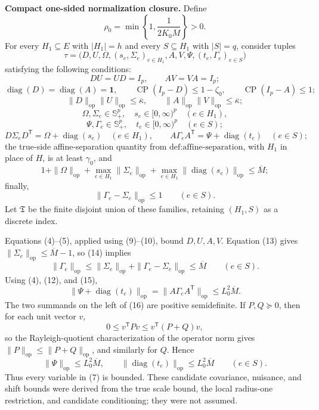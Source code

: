 \textbf{Compact one-sided normalization closure.}
Define
\[
\rho_0=\min\left\{1,\frac{1}{2K_0\overline M}\right\}>0.
\tag{6}
\]
For every \(H_1\subseteq E\) with \(|H_1|=h\) and every \(S\subseteq H_1\) with \(|S|=q\), consider tuples
\[
\tau=\bigl(D,U,\Omega,(s_e,\Sigma_e)_{e\in H_1},
A,V,\Psi,(t_e,\Gamma_e)_{e\in S}\bigr)
\tag{7}
\]
satisfying the following conditions:
\[
DU=UD=I_p,
\qquad
AV=VA=I_p;
\tag{8}
\]
\[
\operatorname{diag}(D)=\operatorname{diag}(A)=\mathbf 1,
\qquad
\operatorname{CP}(I_p-D)\leq1-\zeta_0,
\qquad
\operatorname{CP}(I_p-A)\leq1;
\tag{9}
\]
\[
\|D\|_{\mathrm{op}}\|U\|_{\mathrm{op}}
\leq\overline\kappa,
\qquad
\|A\|_{\mathrm{op}}\|V\|_{\mathrm{op}}
\leq\overline\kappa;
\tag{10}
\]
\[
\Omega,\Sigma_e\in\mathbb S_+^p,\quad
s_e\in[0,\infty)^p\quad(e\in H_1),
\]
\[
\Psi,\Gamma_e\in\mathbb S_+^p,\quad
t_e\in[0,\infty)^p\quad(e\in S);
\tag{11}
\]
\[
D\Sigma_eD^{\mathsf T}=\Omega+\operatorname{diag}(s_e)
\quad(e\in H_1),
\qquad
A\Gamma_eA^{\mathsf T}=\Psi+\operatorname{diag}(t_e)
\quad(e\in S);
\tag{12}
\]
the true-side affine-separation quantity from \(\text{def:affine-separation}\), with \(H_1\) in place of \(H\), is at least \(\gamma_0\), and
\[
1+\|\Omega\|_{\mathrm{op}}
+\max_{e\in H_1}\|\Sigma_e\|_{\mathrm{op}}
+\max_{e\in H_1}\|\operatorname{diag}(s_e)\|_{\mathrm{op}}
\leq\overline M;
\tag{13}
\]
finally,
\[
\|\Gamma_e-\Sigma_e\|_{\mathrm{op}}\leq1
\qquad(e\in S).
\tag{14}
\]
Let \(\mathfrak T\) be the finite disjoint union of these families, retaining \((H_1,S)\) as a discrete index.

Equations (4)--(5), applied using (9)--(10), bound \(D,U,A,V\). Equation (13) gives \(\|\Sigma_e\|_{\mathrm{op}}\leq\overline M-1\), so (14) implies
\[
\|\Gamma_e\|_{\mathrm{op}}
\leq\|\Sigma_e\|_{\mathrm{op}}
+\|\Gamma_e-\Sigma_e\|_{\mathrm{op}}
\leq\overline M
\qquad(e\in S).
\tag{15}
\]
Using (4), (12), and (15),
\[
\|\Psi+\operatorname{diag}(t_e)\|_{\mathrm{op}}
=\|A\Gamma_eA^{\mathsf T}\|_{\mathrm{op}}
\leq L_0^2\overline M.
\tag{16}
\]
The two summands on the left of (16) are positive semidefinite. If \(P,Q\succeq0\), then for each unit vector \(v\),
\[
0\leq v^{\mathsf T}Pv\leq v^{\mathsf T}(P+Q)v,
\]
so the Rayleigh-quotient characterization of the operator norm gives \(\|P\|_{\mathrm{op}}\leq\|P+Q\|_{\mathrm{op}}\), and similarly for \(Q\). Hence
\[
\|\Psi\|_{\mathrm{op}}
\leq L_0^2\overline M,
\qquad
\|\operatorname{diag}(t_e)\|_{\mathrm{op}}
\leq L_0^2\overline M
\qquad(e\in S).
\tag{17}
\]
Thus every variable in (7) is bounded. These candidate covariance, nuisance, and shift bounds were derived from the true scale bound, the local radius-one restriction, and candidate conditioning; they were not assumed.

